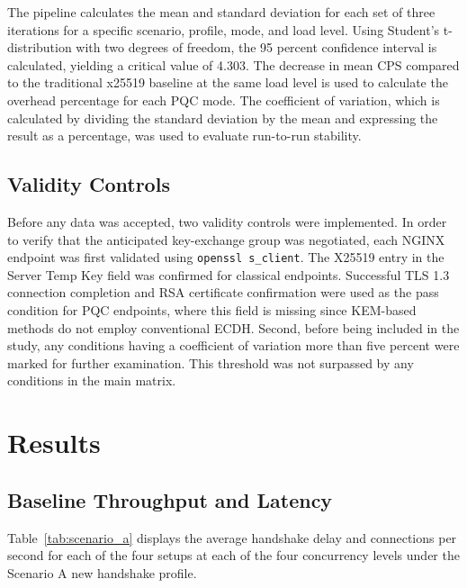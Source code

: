 \documentclass[conference]{IEEEtran}
\begin{document}
The pipeline calculates the mean and standard deviation for each set of three iterations for a specific scenario, profile, mode, and load level. Using Student's t-distribution with two degrees of freedom, the 95 percent confidence interval is calculated, yielding a critical value of 4.303. The decrease in mean CPS compared to the traditional x25519 baseline at the same load level is used to calculate the overhead percentage for each PQC mode.
The coefficient of variation, which is calculated by dividing the standard deviation by the mean and expressing the result as a percentage, was used to evaluate run-to-run stability.

\subsection{Validity Controls}

Before any data was accepted, two validity controls were implemented. In order to verify that the anticipated key-exchange group was negotiated, each NGINX endpoint was first validated using \texttt{openssl s\_client}. The X25519 entry in the Server Temp Key field was confirmed for classical endpoints. Successful TLS 1.3 connection completion and RSA certificate confirmation were used as the pass condition for PQC endpoints, where this field is missing since KEM-based methods do not employ conventional ECDH. Second, before being included in the study, any conditions having a coefficient of variation more than five percent were marked for further examination. This threshold was not surpassed by any conditions in the main matrix.

\section{Results}
\label{sec:results}

\subsection{Baseline Throughput and Latency}

Table~\ref{tab:scenario_a} displays the average handshake delay and connections per second for each of the four setups at each of the four concurrency levels under the Scenario A new handshake profile.
\end{document}
